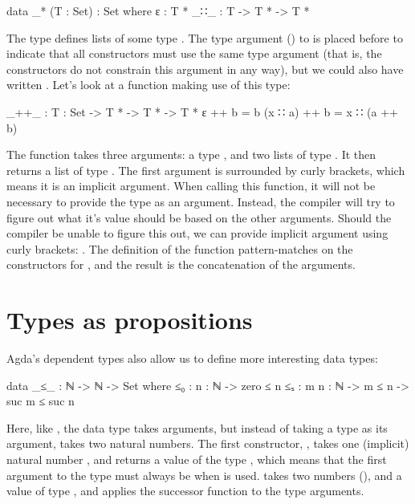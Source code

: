 		\begin{code}
			data _* (T : Set) : Set where
			  ε : T *
			  _∷_ : T -> T * -> T *
		\end{code}
	
		The type \codett{\_*} defines lists of some type . The type
		argument () to \codett{\_*} is placed before \codett{:}
		to indicate that all constructors must use the same type argument (that
		is, the constructors do not constrain this argument in any way), but we
		could also have written . Let's look
		at a function making use of this type:
	
		\begin{code}
			_++_ : {T : Set} -> T * -> T * -> T *
			ε ++ b = b
			(x ∷ a) ++ b = x ∷ (a ++ b)
		\end{code}
	
		The function \codett{\_++\_} takes three arguments: a type ,
		and two lists of type . It then returns a list of type
		. The first argument is surrounded by curly brackets, which
		means it is an implicit argument. When calling this function, it will
		not be necessary to provide the type as an argument. Instead, the
		compiler will try to figure out what it's value should be based on the
		other arguments. Should the compiler be unable to figure this out, we
		can provide implicit argument using curly brackets: . The definition of the function pattern-matches on the
		constructors for , and the result is the concatenation of
		the arguments.

%	

	\section{Types as propositions}

		Agda's dependent types also allow us to define more interesting data
		types:
	
		\begin{code}
			data _≤_ : ℕ -> ℕ -> Set where
			  ≤₀ : {n : ℕ} -> zero ≤ n
			  ≤ₛ : {m n : ℕ} -> m ≤ n -> suc m ≤ suc n
		\end{code}
	
		Here, like \codett{\_*}, the data type  takes arguments,
		but instead of taking a type as its argument,  takes two
		natural numbers. The first constructor, , takes one
		(implicit) natural number , and returns a value of the type
		, which means that the first argument to the type must
		always be  when  is used.  takes two
		numbers (), and a value of type , and applies
		the successor function to the type arguments.
		
